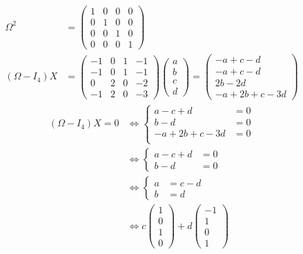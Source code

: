 \documentclass[../main.tex]{subfiles}
\begin{document}
\begin{align*}
    \Omega^2 &= \begin{pmatrix}
        1 & 0 & 0 & 0 \\
        0 & 1 & 0 & 0 \\
        0 & 0 & 1 & 0 \\
        0 & 0 & 0 & 1
    \end{pmatrix} \\
    (\Omega - I_4)X &= \begin{pmatrix}
        -1 & 0 & 1 & -1 \\
        -1 & 0 & 1 & -1 \\
        0 & 2 & 0 & -2 \\
        -1 & 2 & 0 & -3
    \end{pmatrix} \begin{pmatrix}
        a \\
        b \\
        c \\
        d
    \end{pmatrix} = \begin{pmatrix}
        -a + c - d \\
        -a + c - d \\
        2b - 2d \\
        -a + 2b + c - 3d
    \end{pmatrix}
\end{align*}
\begin{align*}
    (\Omega - I_4)X = 0 &\Leftrightarrow \begin{cases}
        a - c + d &= 0 \\
        b - d &= 0 \\
        -a + 2b + c - 3d &= 0 \\
    \end{cases} \\
    &\Leftrightarrow \begin{cases}
        a - c + d &= 0 \\
        b - d &= 0
    \end{cases} \\
    &\Leftrightarrow \begin{cases}
        a &= c - d \\
        b &= d
    \end{cases} \\
    &\Leftrightarrow c \begin{pmatrix}
        1 \\
        0 \\
        1 \\
        0
    \end{pmatrix} + d \begin{pmatrix}
        -1 \\
        1 \\
        0 \\
        1\end{pmatrix}
\end{align*}
\end{document}

